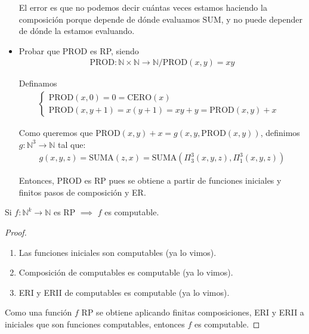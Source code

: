 \begin{itemize}
    El error es que no podemos decir cuántas veces estamos haciendo la 
    composición porque depende de dónde evaluamos $\mathrm{SUM}$, y no puede 
    depender de dónde la estamos evaluando.

    \item Probar que $\mathrm{PROD}$ es RP, siendo
    \begin{gather*}
        \mathrm{PROD}: \mathbb{N} \times \mathbb{N} \to \mathbb{N} /
        \mathrm{PROD}(x, y) = xy
    \end{gather*}

    Definamos
    \begin{gather*}
        \begin{cases}
            \mathrm{PROD}(x,0) = 0 = \mathrm{CERO}(x) & \\
            \mathrm{PROD}(x,y+1) = x(y+1) = xy+y = \mathrm{PROD}(x,y)+x &
        \end{cases}
    \end{gather*}

    Como queremos que 
    $\mathrm{PROD}(x,y)+x = g(x,y, \mathrm{PROD}(x,y))$,
    definimos $g: \mathbb{N}^3 \to \mathbb{N}$ tal que:
    \begin{gather*}
        g(x,y,z) = \mathrm{SUMA}(z,x) 
        = \mathrm{SUMA}(\Pi^3_3(x,y,z), \Pi^3_1(x,y,z))
    \end{gather*}

    Entonces, $\mathrm{PROD}$ es RP pues se obtiene a partir de funciones
    iniciales y finitos pasos de composición y ER.
\end{itemize}

\bigskip

\begin{teorema}{}{}
    Si $f: \mathbb{N}^k \to \mathbb{N}$ es RP $\implies$ $f$ es computable.
\end{teorema}

\begin{proof} \phantom{.}

    \begin{enumerate}
        \item Las funciones iniciales son computables (ya lo vimos).
        \item Composición de computables es computable (ya lo vimos).
        \item ERI y ERII de computables es computable (ya lo vimos).
    \end{enumerate}

    Como una función $f$ RP se obtiene aplicando finitas composiciones, ERI
    y ERII a iniciales que son funciones computables, entonces $f$ es 
    computable.

\end{proof}

